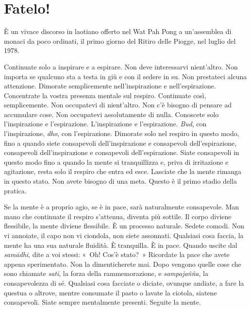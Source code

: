 \chapter{Fatelo!}

\begin{openingQuote}
  \centering

  È un vivace discorso in laotiano offerto nel Wat Pah Pong a un'assemblea di
  monaci da poco ordinati, il primo giorno del Ritiro delle Piogge, nel luglio
  del 1978.
\end{openingQuote}

Continuate solo a inspirare e a espirare. Non deve interessarvi
nient'altro. Non importa se qualcuno sta a testa in giù e con il sedere
in su. Non prestateci alcuna attenzione. Dimorate semplicemente
nell'inspirazione e nell'espirazione. Concentrate la vostra presenza
mentale sul respiro. Continuate così, semplicemente. Non occupatevi di
nient'altro. Non c'è bisogno di pensare ad accumulare cose. Non
occupatevi assolutamente di nulla. Conoscete solo l'inspirazione e
l'espirazione. L'inspirazione e l'espirazione. \emph{Bud}, con
l'inspirazione, \emph{dho}, con l'espirazione. Dimorate solo nel respiro
in questo modo, fino a quando siete consapevoli dell'inspirazione e
consapevoli dell'espirazione, consapevoli dell'inspirazione e
consapevoli dell'espirazione. Siate consapevoli in questo modo fino a
quando la mente si tranquillizza e, priva di irritazione e agitazione,
resta solo il respiro che entra ed esce. Lasciate che la mente rimanga
in questo stato. Non avete bisogno di una meta. Questo è il primo stadio
della pratica.

Se la mente è a proprio agio, se è in pace, sarà naturalmente
consapevole. Man mano che continuate il respiro s'attenua, diventa più
sottile. Il corpo diviene flessibile, la mente diviene flessibile. È un
processo naturale. Sedete comodi. Non vi annoiate, il capo non vi
ciondola, non siete assonnati. Qualsiasi cosa faccia, la mente ha una
sua naturale fluidità. È tranquilla. È in pace. Quando uscite dal
\emph{samādhi}, dite a voi stessi: «~Oh! Cos'è stato?~» Ricordate la
pace che avete appena sperimentato. Non la dimenticherete mai. Dopo
vengono quelle cose che sono chiamate \emph{sati}, la forza della
rammemorazione, e \emph{sampajañña}, la consapevolezza di sé. Qualsiasi
cosa facciate o diciate, ovunque andiate, a fare la questua o altrove,
mentre consumate il pasto o lavate la ciotola, siatene consapevoli.
Siate sempre mentalmente presenti. Seguite la mente.

